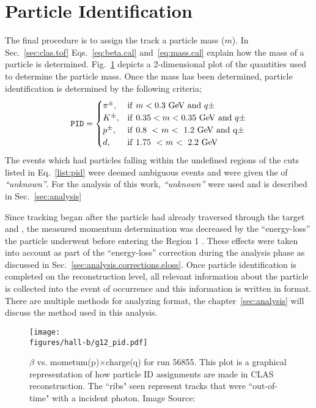 \section{Particle Identification}\label{sec:data.pid}

The final procedure is to assign the track a particle mass ($m$). In Sec.~\ref{sec:clas.tof} Eqs.~\ref{eq:beta.cal} and~\ref{eq:mass.cal} explain how the mass of a particle is determined. Fig.~\ref{fig:data.pid} depicts a 2-dimensional plot of the quantities used to determine the particle mass. Once the mass has been determined, particle identification  is determined by the following criteria;
\begin{align}\label{list:pid}
\abbr{PID} =
\begin{cases}
\pi^{\pm}, & \mathrm{if} \  m  <  0.3~\mathrm{GeV} \ \mathrm{and} \  q  \pm \\
K^{\pm}, &  \mathrm{if} \ 0.35 < m  <  0.35~\mathrm{GeV} \ \mathrm{and} \  q  \pm  \\
p^{\pm}, & \mathrm{if \ 0.8 \ < \ }m \mathrm{\ < \ 1.2 \ GeV \  and \  q  \pm} \\
d, & \mathrm{if \ 1.75 \ < \  }m  \mathrm{\ < \ 2.2 \ GeV } \\
\end{cases}
\end{align}
The events which had particles falling within the undefined regions of the cuts listed in Eq.~\ref{list:pid} were deemed ambiguous events and were given the  of \emph{``unknown''}. For the analysis of this work, \emph{``unknown''} were used and is described in Sec.~\ref{sec:analysis}

Since tracking began after the particle had already traversed through the target and , the measured momentum determination was decreased by the ``energy-loss'' the particle underwent before entering the Region 1 . These effects were taken into account as part of the ``energy-loss'' correction during the analysis phase as discussed in Sec.~\ref{sec:analysis.corrections.eloss}.  Once particle identification is completed on the reconstruction level, all relevant information about the particle is collected into the event of occurrence and this information is written in  format. There are multiple methods for analyzing  format, the chapter~\ref{sec:analysis} will discuss the method used in this analysis. 
%
\begin{figure}\begin{center}
\texttt{[image: \\figures/hall-b/g12\_pid.pdf]}
\caption[$\beta$ vs. mometum(p)$\times$charge(q) for run 56855]{\label{fig:data.pid} $\beta$ vs. mometum(p)$\times$charge(q) for run 56855. This plot is a graphical representation of how particle ID assignments are made in CLAS reconstruction. The ``ribs" seen represent tracks that were ``out-of-time" with a incident photon. Image Source:~\cite{bookwalter}}
\end{center}\end{figure}
